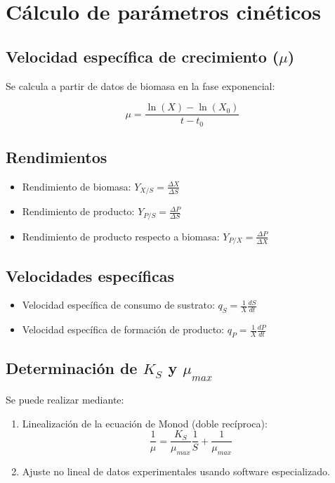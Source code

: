 \section{Cálculo de parámetros cinéticos}

\subsection{Velocidad específica de crecimiento ($\mu$)}
Se calcula a partir de datos de biomasa en la fase exponencial:

\begin{equation}
    \mu = \frac{\ln(X) - \ln(X_0)}{t - t_0}
\end{equation}

\subsection{Rendimientos}
\begin{itemize}
    \item Rendimiento de biomasa: $Y_{X/S} = \frac{\Delta X}{\Delta S}$
    \item Rendimiento de producto: $Y_{P/S} = \frac{\Delta P}{\Delta S}$
    \item Rendimiento de producto respecto a biomasa: $Y_{P/X} = \frac{\Delta P}{\Delta X}$
\end{itemize}

\subsection{Velocidades específicas}
\begin{itemize}
    \item Velocidad específica de consumo de sustrato: $q_S = \frac{1}{X} \frac{dS}{dt}$
    \item Velocidad específica de formación de producto: $q_P = \frac{1}{X} \frac{dP}{dt}$
\end{itemize}

\subsection{Determinación de $K_S$ y $\mu_{max}$}
Se puede realizar mediante:
\begin{enumerate}
    \item Linealización de la ecuación de Monod (doble recíproca):
    \begin{equation}
        \frac{1}{\mu} = \frac{K_S}{\mu_{max}} \frac{1}{S} + \frac{1}{\mu_{max}}
    \end{equation}
    \item Ajuste no lineal de datos experimentales usando software especializado.
\end{enumerate}

